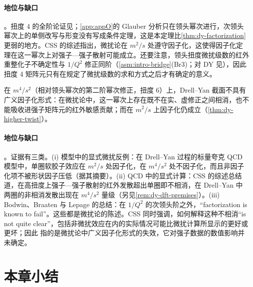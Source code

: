 \paragraph{地位与缺口}\tagA。扭度 4 的全阶论证见\cite{QiuSterman1991b}；\cref{app:appO}的 Glauber 分析只在领头幂次进行，次领头幂次上的单侧改写与形变没有写成条件定理，这是本定理比\cref{thm:dy-factorization}更弱的地方。CSS 的综述指出，微扰论在 $m^2/s$ 处遵守因子化，这使得因子化定理在这一幂次上对强子—强子散射可能成立\cite[第~10.2~节]{CollinsSoperSterman1989}。还要注意，领头扭度微扰级数的红外重整化子不确定性与 $1/Q^2$ 修正同阶（\cref{asm:intro-bridge}(Br3)；对 DY 见\cite{BenekeBraun1995b}），因此扭度 4 矩阵元只有在规定了微扰级数的求和方式之后才有确定的意义。

\begin{proposition}\label{prop:dy-twist6-failure}
在 $m^4/s^2$（相对领头幂次的第二阶幂次修正，扭度 6）上，Drell--Yan 截面不具有广义因子化形式：在微扰论中，这一幂次上存在既不在实、虚修正之间相消，也不能吸收进强子矩阵元的红外敏感贡献；而在 $m^2/s$ 上因子化仍成立（\cref{thm:dy-higher-twist}）。
\end{proposition}

\paragraph{地位与缺口}\tagV。证据有三类。(i) 模型中的显式微扰反例：在 Drell--Yan 过程的标量夸克 QCD 模型中，单圈软胶子效应在 $m^2/s$ 处因子化，在 $m^4/s^2$ 处不因子化，而且非因子化项不被形状因子压低\cite{Basu:1984ba}（据其摘要）。(ii) QCD 中的显式计算：CSS 的综述总结道，在高扭度上强子—强子散射的红外发散超出单圈即不相消，在 Drell--Yan 中两圈的非相消发散出现在 $m^4/s^2$ 量级\cite[第~10.2~节]{CollinsSoperSterman1989}（另见\cref{rem:dy-dft-premises}）。(iii) Bodwin、Braaten 与 Lepage 的总结：在 $1/Q^2$ 的次领头阶之外，“factorization is known to fail”\cite[第~VI~节]{BodwinBraatenLepage1995}。这些都是微扰论的陈述。CSS 同时强调，如何解释这种不相消“is not quite clear”，包括非微扰效应在内的实际情况可能比微扰计算所显示的更好或更坏\cite[第~10.2~节]{CollinsSoperSterman1989}；因此 \tagV 指的是微扰论中广义因子化形式的失效，它对强子数据的数值影响并未确定。

\section{本章小结}\label{sec:dy-summary}


